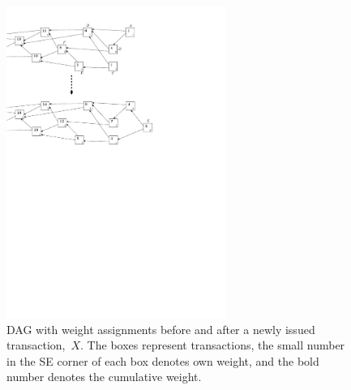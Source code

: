 \documentclass[12pt]{article}
\begin{document}
\begin{CJK}{UTF8}{bkai}
\begin{figure}
 \centering \includegraphics[width=0.64\textwidth]{weights} 
\caption{DAG with weight assignments before and after
a newly issued transaction,~$X$. The boxes represent transactions,
the small number in the SE corner of each box denotes own weight, and the 
bold number denotes the cumulative weight.
}
\label{f_weights}
\end{figure}


\end{CJK}
\end{document}
